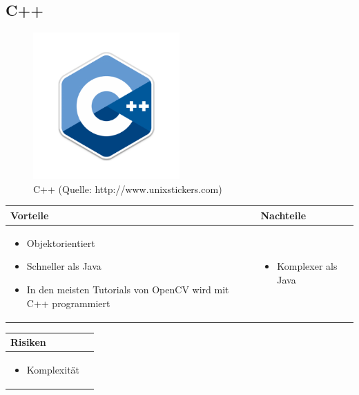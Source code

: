 \pagebreak


\subsection{C++}
\begin{figure}[h!]%
\centering
\includegraphics[width=0.5\textwidth]{fig/cplusplus.png}
\caption{C++ (Quelle: http://www.unixstickers.com)}
\label{fig:C++}
\end{figure}
\begin{table}[h]
\begin{tabular}{p{} | p{}}


 \textbf{Vorteile} & \textbf{Nachteile} \\ \hline
	 
\begin{itemize}
\item Objektorientiert
\item Schneller als Java
\item In den meisten Tutorials von OpenCV wird mit C++ programmiert
\end{itemize}

 
 &
 
\begin{itemize}
\item Komplexer als Java
\end{itemize}

\end{tabular}
\end{table}

\begin{table}[h]
\begin{tabular}{p{}p{}}


 \textbf{Risiken} & \\ \hline
	 
\begin{itemize}
\item Komplexität
\end{itemize}

 
\end{tabular}
\end{table}

\pagebreak